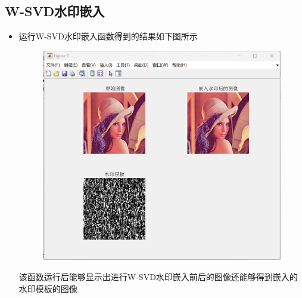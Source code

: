 \documentclass[a4paper,11pt,UTF8]{ctexart}
\newcommand{\bottomcaption}{%
\setlength{\abovecaptionskip}{6pt}%
\setlength{\belowcaptionskip}{6pt}%
\caption}
\newcommand{\xiaowuhao}{\fontsize{9pt}{\baselineskip}\selectfont}   %
\begin{document}
  \subsection{W-SVD水印嵌入}
    \begin{itemize}
      \item 运行W-SVD水印嵌入函数得到的结果如下图所示
        \begin{figure}[H]
          \centering
          \includegraphics[width=11cm]{W-SVD_hide.png}
          \bottomcaption{\xiaowuhao{W-SVD水印嵌入结果}}
        \end{figure}
        该函数运行后能够显示出进行W-SVD水印嵌入前后的图像还能够得到嵌入的水印模板的图像
    \end{itemize}
\newpage
\end{document}
